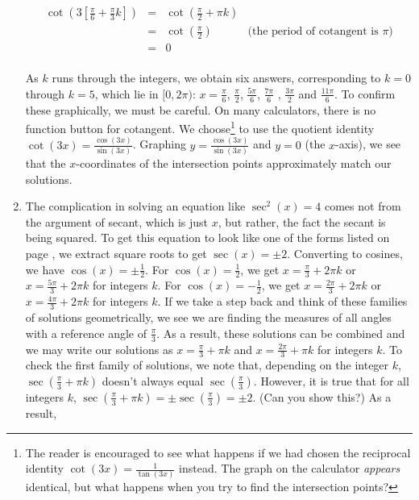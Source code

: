\begin{ex}
\begin{enumerate}
\[\begin{array}{rclr}
\cot\left(3\left[ \frac{\pi}{6} + \frac{\pi}{3} k\right]\right)  &  = &  \cot\left(\frac{\pi}{2} + \pi k\right)  & \\ [3pt]
																												& =  &   \cot\left(\frac{\pi}{2}\right) &  \text{(the period of cotangent is $\pi$)} \\ [3pt]
																												& =  & 0 & \\
																								
\end{array}\] 



 As $k$ runs through the integers, we obtain six answers, corresponding to $k=0$ through $k=5$, which lie in $[0, 2\pi)$: $x = \frac{\pi}{6}$, $\frac{\pi}{2}$, $\frac{5\pi}{6}$, $\frac{7\pi}{6}$ , $\frac{3\pi}{2}$ and  $\frac{11\pi}{6}$. To confirm these graphically, we must be careful. On many calculators, there is no function button for cotangent.  We choose\footnote{The reader is encouraged to see what happens if we had chosen the reciprocal identity $\cot(3x) = \frac{1}{\tan(3x)}$ instead.  The graph on the calculator \textit{appears} identical, but what happens when you try to find the intersection points?} to use the quotient identity  $\cot(3x) = \frac{\cos(3x)}{\sin(3x)}$.  Graphing $y = \frac{\cos(3x)}{\sin(3x)}$ and $y = 0$ (the $x$-axis), we see that the $x$-coordinates of the intersection points approximately match our solutions.

\item The complication in solving an equation like $\sec^{2}(x) = 4$ comes not from the argument of secant, which is just $x$, but rather, the fact the secant is being squared.  To get this equation to look like one of the forms listed on page \pageref{trigeqnstrategy1}, we extract square roots to get $\sec(x) = \pm 2$. Converting to cosines, we have  $\cos(x) = \pm \frac{1}{2}$.  For $\cos(x) = \frac{1}{2}$, we get $x = \frac{\pi}{3} + 2\pi k$ or $x = \frac{5\pi}{3} + 2\pi k$ for integers $k$.  For $\cos(x) = -\frac{1}{2}$, we get $x = \frac{2\pi}{3} + 2\pi k$ or $x = \frac{4\pi}{3} + 2\pi k$ for integers $k$.  If we take a step back and think of these families of solutions geometrically, we see we are finding the measures of all angles with a reference angle of $\frac{\pi}{3}$.  As a result, these solutions can be combined and we may write our solutions as $x = \frac{\pi}{3} + \pi k$ and $x = \frac{2\pi}{3} + \pi k$ for integers $k$.  To check the first family of solutions, we note that, depending on the integer $k$,  $\sec\left(\frac{\pi}{3} + \pi k\right)$ doesn't always equal $\sec\left(\frac{\pi}{3}\right)$.  However, it is true that for all integers $k$,  $\sec\left(\frac{\pi}{3} + \pi k\right) = \pm \sec\left(\frac{\pi}{3}\right) = \pm 2$.  (Can you show this?)  As a result, 



\end{enumerate}
\end{ex}
